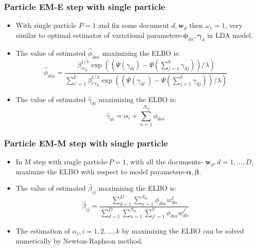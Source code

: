 \documentclass[10pt]{beamer}
\newcommand{\bi}{\begin{itemize}}
\newcommand{\ei}{\end{itemize}}
\newcommand{\bs}{\boldsymbol}
\begin{document}
\begin{frame}
	\frametitle{Particle EM-E step with single particle}
	\bi
	\item With single particle $P=1$ and fix some document $d,\bs{w}_d$  then $\omega_1=1$, very similar to optimal estimator of variational parameters-$\bs{\phi}_{dn},\bs{\gamma}_d$ in LDA model.
	\vspace{1ex}
\item The value of estimated $\hat{\phi}_{dni}$ maximizing the ELBO is:
\[
\hat{\phi}_{dni}=\frac{\beta_{iv_d}^{1/\lambda}\exp((\Psi(\gamma_{di})-\Psi(\sum_{j=1}^{k}\gamma_{dj}))/\lambda)}{\sum_{i'=1}^{k}\beta_{i'v_d}^{1/\lambda}\exp((\Psi(\gamma_{di'})-\Psi(\sum_{j=1}^{k}\gamma_{dj}))/\lambda)}
\]
	\vspace{1ex}
\item The value of estimated $\hat{\gamma}_{di}$ maximizing the ELBO is:\\
\[
\hat{\gamma}_{di}=\alpha_i+\sum_{n=1}^{N_d}\phi_{dni}
\]
	\ei
	\end{frame}	
\begin{frame}
	\frametitle{Particle EM-M step with single particle}
	\bi
	\item In M step with single particle-$P=1$, with all the documents-
	$\bs{w}_d,d=1,\ldots,D$, maximize the  ELBO with respect to model parameters-$\bs{\alpha,}\bs{\beta}$.
	\vspace{1ex}
	\item The value of estimated $\hat{\beta}_{ij}$ maximizing the ELBO is:
\[
\hat{\beta}_{ij}=\frac{\sum_{d=1}^{D}\sum_{n=1}^{N_d}\phi_{dni}w_{dn}^j}{\sum_{d=1}^{D}\sum_{n=1}^{N_d}\sum_{j'=1}^{V}\phi_{dni}w_{dn}^{j'}}
\]
	\vspace{1ex}
	\item The estimation of $\alpha_{i},i=1,2,\ldots,k$ by maximizing the ELBO can be solved numerically by Newton-Raphson method.\\
	\ei
\end{frame}
\end{document}

